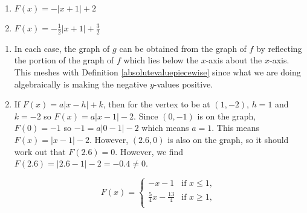 \begin{multicols}{2}

\begin{enumerate}

\setcounter{enumi}{\value{HW}}

\item $F(x) = -|x+1|+2$  

\item $F(x) = -\frac{1}{2} |x+1|+\frac{3}{2}$

\setcounter{HW}{\value{enumi}}

\end{enumerate}

\end{multicols}

\begin{enumerate}
\setcounter{enumi}{\value{HW}}

\item  In each case, the graph of $g$ can be obtained from the graph of $f$ by reflecting the portion of the graph of $f$ which lies below the $x$-axis about the $x$-axis.  This meshes with Definition \ref{absolutevaluepiecewise} since what we are doing algebraically is making the negative $y$-values positive.

\newpage

\item  If $F(x) = a|x-h| + k$, then for the vertex to be at $(1,-2)$, $h  =1$ and $k = -2$ so $F(x) = a |x-1| - 2$.  Since $(0,-1)$ is on the graph, $F(0) = -1$ so $-1 = a|0-1|-2$ which means $a = 1$.  This means $F(x) = |x-1|-2$.  However, $(2.6,0)$ is also on the graph, so it should work out that $F(2.6) = 0$.  However, we find $F(2.6) = |2.6-1| - 2 = -0.4 \neq 0$.  

 \[ F(x) =  \begin{cases} 
 -x-1 &  \text{if $x \leq 1$, } \\
   \frac{5}{4} x - \frac{13}{4}  & \text{if $x \geq 1$,} \\
  \end{cases}\]
  
\setcounter{HW}{\value{enumi}}
\end{enumerate}


